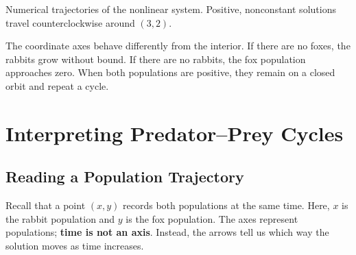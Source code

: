 \documentclass[10pt,letterpaper]{article}
\begin{document}
\begin{center}
\small
Numerical trajectories of the nonlinear system.
Positive, nonconstant solutions travel counterclockwise
around $(3,2)$.
\end{center}

The coordinate axes behave differently from the interior.
If there are no foxes, the rabbits grow without bound.
If there are no rabbits, the fox population approaches zero.
When both populations are positive, they remain on a
closed orbit and repeat a cycle.

\section{Interpreting Predator--Prey Cycles}

\subsection{Reading a Population Trajectory}

Recall that a point $(x,y)$ records both populations
at the same time. Here, $x$ is the rabbit population
and $y$ is the fox population. The axes represent
populations; \textbf{time is not an axis}.
Instead, the arrows tell us which way the solution
moves as time increases.


\end{document}
